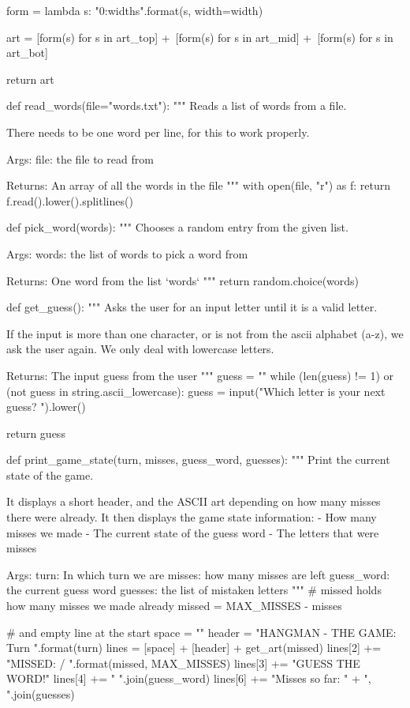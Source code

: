 {\begin{python}
    form = lambda s: "{0:{width}s}".format(s, width=width)

    art = [form(s) for s in art_top] +\
          [form(s) for s in art_mid] +\
          [form(s) for s in art_bot]
    
    return art


def read_words(file="words.txt"):
    """
    Reads a list of words from a file.

    There needs to be one word per line, for this to work properly.

    Args:
        file: the file to read from

    Returns:
        An array of all the words in the file
    """
    with open(file, "r") as f:
        return f.read().lower().splitlines()


def pick_word(words):
    """
    Chooses a random entry from the given list.

    Args:
        words: the list of words to pick a word from
    
    Returns:
        One word from the list `words`
    """
    return random.choice(words)


def get_guess():
    """
    Asks the user for an input letter until it is a valid letter.

    If the input is more than one character, or is not from the ascii
    alphabet (a-z), we ask the user again. We only deal with lowercase
    letters.

    Returns:
        The input guess from the user
    """
    guess = ""
    while (len(guess) != 1) or (not guess in string.ascii_lowercase):
        guess = input("Which letter is your next guess? ").lower()

    return guess


def print_game_state(turn, misses, guess_word, guesses):
    """
    Print the current state of the game.

    It displays a short header, and the ASCII art depending on how many
    misses there were already. It then displays the game state information:
    - How many misses we made
    - The current state of the guess word
    - The letters that were misses

    Args:
        turn: In which turn we are
        misses: how many misses are left
        guess_word: the current guess word
        guesses: the list of mistaken letters
    """
    # missed holds how many misses we made already
    missed = MAX_MISSES - misses

    # and empty line at the start
    space = ""
    header = "HANGMAN - THE GAME: Turn {}".format(turn)
    lines = [space] + [header] + get_art(missed)
    lines[2] += "MISSED: {} / {}".format(missed, MAX_MISSES)
    lines[3] += "GUESS THE WORD!"
    lines[4] += " ".join(guess_word)
    lines[6] += "Misses so far: " + ", ".join(guesses)
    

\end{python}}
